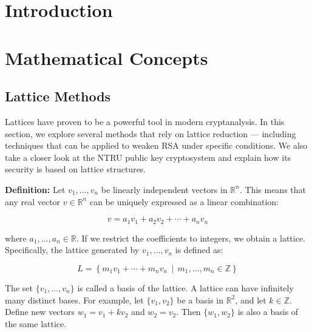 \documentclass[a4paper,12pt]{article}
\begin{document}
\tableofcontents
\newpage

\section{Introduction}
\newpage
\section{Mathematical Concepts}
\subsection{Lattice Methods}
Lattices have proven to be a powerful tool in modern cryptanalysis.  
In this section, we explore several methods that rely on lattice reduction — including techniques that can be applied to weaken RSA under specific conditions.  
We also take a closer look at the NTRU public key cryptosystem and explain how its security is based on lattice structures.

\textbf{Definition:}
Let \( v_1, \ldots, v_n \) be linearly independent vectors in \( \mathbb{R}^n \).  
This means that any real vector \( v \in \mathbb{R}^n \) can be uniquely expressed as a linear combination:

\[
v = a_1 v_1 + a_2 v_2 + \cdots + a_n v_n
\]

where \( a_1, \ldots, a_n \in \mathbb{R} \).  
If we restrict the coefficients to integers, we obtain a lattice.  
Specifically, the lattice generated by \( v_1, \ldots, v_n \) is defined as:

\[
L = \left\{ m_1 v_1 + \cdots + m_n v_n \,\middle|\, m_1, \ldots, m_n \in \mathbb{Z} \right\}
\]

The set \( \{v_1, \ldots, v_n\} \) is called a basis of the lattice.  
A lattice can have infinitely many distinct bases. For example,  
let \( \{v_1, v_2\} \) be a basis in \( \mathbb{R}^2 \), and let \( k \in \mathbb{Z} \).  
Define new vectors \( w_1 = v_1 + k v_2 \) and \( w_2 = v_2 \).  
Then \( \{w_1, w_2\} \) is also a basis of the same lattice.
\end{document}

